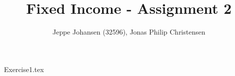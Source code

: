 \documentclass[12pt,a4paper]{article}
\author{Jeppe Johansen (32596), Jonas Philip Christensen}
\title{Fixed Income - Assignment 2}
\begin{document}
\maketitle

{Exercise1.tex}
\end{document}
